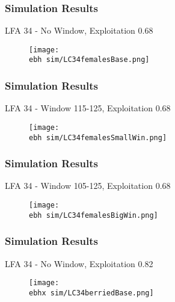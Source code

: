 \documentclass{beamer}
\newcommand{\ebh}{\string~/bio.data/bio.lobster/figures/LFA3438Framework2019/} %
\newcommand{\ebhx}{\string~/bio.data/bio.lobster/figures/LFA3438Framework2019/figures/Brad/} %
\begin{document}
\begin{frame}
\frametitle{Simulation Results}
LFA 34 - No Window, Exploitation 0.68
\begin{figure}
        \begin{center}
            \texttt{[image: \\ebh sim/LC34femalesBase.png]}
        \end{center}
    \end{figure}
\end{frame}



\begin{frame}
\frametitle{Simulation Results}
LFA 34 - Window 115-125, Exploitation 0.68
\begin{figure}
        \begin{center}
            \texttt{[image: \\ebh sim/LC34femalesSmallWin.png]}
        \end{center}
    \end{figure}
\end{frame}


\begin{frame}
\frametitle{Simulation Results}
LFA 34 - Window 105-125, Exploitation 0.68
\begin{figure}
        \begin{center}
            \texttt{[image: \\ebh sim/LC34femalesBigWin.png]}
        \end{center}
    \end{figure}
\end{frame}




\begin{frame}
\frametitle{Simulation Results}
LFA 34 - No Window, Exploitation 0.82
\begin{figure}
        \begin{center}
            \texttt{[image: \\ebhx sim/LC34berriedBase.png]}
        \end{center}
    \end{figure}
\end{frame}
\end{document}
